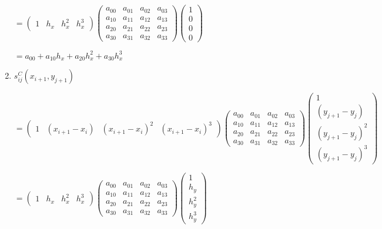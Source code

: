 \documentclass[11pt]{article}
\begin{document}
\begin{enumerate}[label=\textbf{\arabic*)}]
\begin{flushleft}
      $= \begin{pmatrix}
        1 & h_x & h_x^2 & h_x^3
      \end{pmatrix}
      \begin{pmatrix}
        a_{00}  & a_{01} & a_{02} & a_{03} \\
        a_{10}  & a_{11} & a_{12} & a_{13} \\
        a_{20}  & a_{21} & a_{22} & a_{23} \\
        a_{30}  & a_{31} & a_{32} & a_{33}
      \end{pmatrix}
      \begin{pmatrix}
        1  \\
        0  \\
        0  \\
        0
      \end{pmatrix}$

      $= a_{00} + a_{10}h_x + a_{20}h_x^2 + a_{30}h_x^3$
    \end{flushleft}

    \item $s_{ij}^C(x_{i + 1}, y_{j + 1})$

    \begin{flushleft}
    $= \begin{pmatrix}
      1 & (x_{i + 1} - x_i) & (x_{i + 1} - x_i)^2 & (x_{i + 1} - x_i)^3
    \end{pmatrix}
    \begin{pmatrix}
      a_{00}  & a_{01} & a_{02} & a_{03} \\
      a_{10}  & a_{11} & a_{12} & a_{13} \\
      a_{20}  & a_{21} & a_{22} & a_{23} \\
      a_{30}  & a_{31} & a_{32} & a_{33}
    \end{pmatrix}
    \begin{pmatrix}
      1  \\
      (y_{j + 1} - y_j) \\
      (y_{j + 1} - y_j)^2  \\
      (y_{j + 1} - y_j)^3
    \end{pmatrix}$


    $= \begin{pmatrix}
      1 & h_x & h_x^2 & h_x^3
    \end{pmatrix}
    \begin{pmatrix}
      a_{00}  & a_{01} & a_{02} & a_{03} \\
      a_{10}  & a_{11} & a_{12} & a_{13} \\
      a_{20}  & a_{21} & a_{22} & a_{23} \\
      a_{30}  & a_{31} & a_{32} & a_{33}
    \end{pmatrix}
    \begin{pmatrix}
      1  \\
      h_y  \\
      h_y^2  \\
      h_y^3
    \end{pmatrix}$


\end{flushleft}
\end{enumerate}
\end{document}
